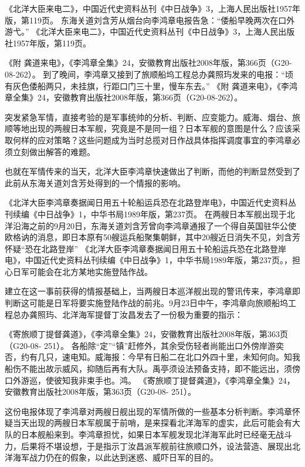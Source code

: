 \documentclass[12pt,UTF8]{ctexbook}
\begin{document}
《北洋大臣来电二》，中国近代史资料丛刊《中日战争》3，上海人民出版社1957年版，第119页。
东海关道刘含芳从烟台向李鸿章电报告急：“倭船早晚两次在口外游弋。” 《北洋大臣来电二》，中国近代史资料丛刊《中日战争》3，上海人民出版社1957年版，第119页。

《附 龚道来电》，《李鸿章全集》24，安徽教育出版社2008年版，第366页（G20-08-262）。
到了晚间，李鸿章又接到了旅顺船坞工程总办龚照玙发来的电报：“顷有灰色倭船两只，未挂旗，行距口门三十里，慢车东去。” 《附 龚道来电》，《李鸿章全集》24，安徽教育出版社2008年版，第366页（G20-08-262）。

突发紧急军情，直接考验的是军事统帅的分析、判断、应变能力。威海、烟台、旅顺等地出现的两艘日本军舰，究竟是不是同一组？日本军舰的意图是什么？应该采取何样的应对策略？这些问题成为当时总揽对日作战具体指挥调度事宜的李鸿章必须立刻做出解答的难题。

也就在军情传来的当天，北洋大臣李鸿章快速做出了判断，而他的判断显然受到了此前从东海关道刘含芳处得到的一个情报的影响。

《北洋大臣李鸿章奏据闻日用五十轮船运兵恐在北路登岸电》，中国近代史资料丛刊续编《中日战争》1，中华书局1989年版，第237页。
在两艘日本军舰出现于北洋沿海之前的9月20日，东海关道刘含芳曾向李鸿章通报了一个得自英国驻华公使欧格讷的消息，即日本原有50艘运兵船聚集朝鲜，其中20艘近日消失不见，刘含芳怀疑“恐在北路登岸” 《北洋大臣李鸿章奏据闻日用五十轮船运兵恐在北路登岸电》，中国近代史资料丛刊续编《中日战争》1，中华书局1989年版，第237页。，担心日军可能会在北方某地实施登陆作战。

建立在这一事前获得的情报基础上，当两艘日本巡洋舰出现的警讯传来，李鸿章即判断这可能是日军将要实施登陆作战的前兆。9月23日中午，李鸿章向旅顺船坞工程总办龚照玙、北洋海军提督丁汝昌发去了一份极为重要的指示：

《寄旅顺丁提督龚道》，《李鸿章全集》24，安徽教育出版社2008年版，第363页（G20-08- 251）。
各船除“定”“镇”赶修外，其余受伤轻者尚能出口外傍岸游奕否，约有几只，速电知。威海报：今早有日船二在北口外四十里，未知何向。知我船伤不能出故示威风，抑随后再有大队。禹亭须设法预备支持，即不能远出，须傍口外游巡，使彼知我非束手也。鸿。 《寄旅顺丁提督龚道》，《李鸿章全集》24，安徽教育出版社2008年版，第363页（G20-08- 251）。

这份电报体现了李鸿章对两艘日舰出现的军情所做的一些基本分析判断。李鸿章怀疑当天出现的两艘日本军舰属于前哨，是来探看北洋海军的虚实，此后可能会有大队的日本舰船来到。李鸿章担忧，如果日本军舰发现北洋海军此时已经毫无战斗力，后果将不堪设想，于是指示丁汝昌派军舰前往旅顺口外，设法营造、展现出北洋海军战力仍在的假象，以此达到迷惑、威吓日军的目的。
\end{document}
